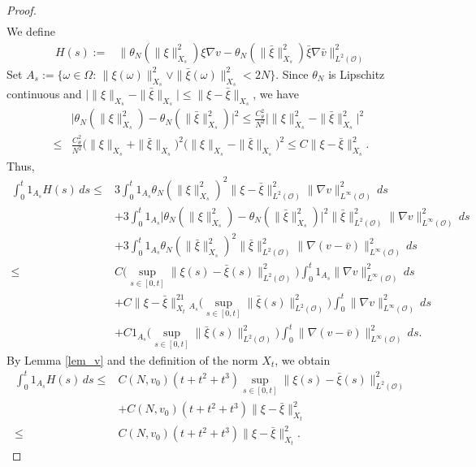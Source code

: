 \documentclass[reqno, 11pt]{amsart}
\theoremstyle{definition}
\numberwithin{equation}{section} \numberwithin{lem}{section}
\numberwithin{thm}{section} \numberwithin{prop}{section}
\numberwithin{cor}{section} \numberwithin{rem}{section}
\numberwithin{defn}{section}
\begin{document}
\begin{proof}
\begin{align}
    \end{align}
     We define \begin{align*}
H(s):=&\|\theta_N(\|\xi\|_{X_s}^2)\xi\nabla v-\theta_N(\|\bar \xi\|_{X_s}^2)\bar \xi\nabla \bar v\|_{L^2(\mathcal {O})}^2\end{align*}
    Set   $A_s:=\big\{\omega\in\Omega:\,\|\xi(\omega)\|_{X_s}^2\vee \|\bar \xi(\omega)\|_{X_s}^2< 2N\big\}$. Since $\theta_N$ is Lipschitz continuous and $\big|\| \xi\|_{X_s}-\| \bar \xi\|_{X_s}\big|\le \|\xi- \bar \xi\|_{X_s}$, we have
\begin{align}
    \nonumber&\big|\theta_N(\|\xi\|_{X_s}^2)-\theta_N(\|\bar \xi\|_{X_s}^2)\big|^2\le \frac{{C^2_\theta}}{N^2}\big|\|\xi\|_{X_s}^2-\|\bar \xi\|_{X_s}^2\big|^2\\\le& \frac{{C^2_\theta}}{N^2}\big(\|\xi\|_{X_s}+\|\bar \xi\|_{X_s}\big)^2\big(\|\xi\|_{X_s}-\|\bar \xi\|_{X_s}\big)^2\le C\|\xi-\bar \xi\|_{X_s}^2 .
\end{align} Thus, 
    \begin{align*}
\int_0^t1_{A_s}H(s)\,ds\le&3\int_0^t1_{A_s}\theta_N(\|\xi\|_{X_s}^2)^2\|\xi-\bar \xi\|_{L^2(\mathcal {O})}^2\|\nabla v\|_{L^\infty(\mathcal {O})}^2\,ds\\&+3\int_0^t1_{A_s}\big|\theta_N(\|\xi\|_{X_s}^2)-\theta_N(\|\bar \xi\|_{X_s}^2)\big|^2\| \bar \xi\|_{L^2(\mathcal {O})}^2\|\nabla v\|_{L^\infty(\mathcal {O})}^2\,ds\\&+3\int_0^t1_{A_s}\theta_N(\|\bar \xi\|_{X_s}^2)^2\|\bar \xi\|_{L^2(\mathcal {O})}^2\|\nabla(v- \bar v)\|_{L^\infty(\mathcal {O})}^2\,ds\\\le&C\big(\sup_{s\in[0,t]}\|\xi(s)-\bar \xi(s)\|_{L^2(\mathcal {O})}^2\big)\int_0^t1_{A_s}\|\nabla v\|_{L^\infty(\mathcal {O})}^2\,ds\\&+C\|\xi- \bar \xi\|_{X_t}^21_{A_s}\big(\sup_{s\in[0,t]}\|\bar \xi(s)\|_{L^2(\mathcal {O})}^2\big)\int_0^t\|\nabla v\|_{L^\infty(\mathcal {O})}^2\,ds\\&+C1_{A_s}\big(\sup_{s\in[0,t]}\|\bar \xi(s)\|_{L^2(\mathcal {O})}^2\big)\int_0^t\|\nabla (v-\bar v)\|_{L^\infty(\mathcal {O})}^2\,ds.
\end{align*}
By Lemma \ref{lem_v} and the definition of the norm $X_t$, we obtain 
\begin{align}\label{1_A}
   \nonumber \int_0^t1_{A_s}H(s)\,ds\le& C(N,v_0)(t+t^2+t^3)\sup_{s\in[0,t]}\|\xi(s)-\bar \xi(s)\|_{L^2(\mathcal {O})}^2\\\nonumber &+C(N,v_0)(t+t^2+t^3)\|\xi-\bar \xi\|_{X_t}^2\\\le&C(N,v_0)(t+t^2+t^3)\|\xi-\bar \xi\|_{X_t}^2.

\end{align}
\end{proof}
\end{document}
